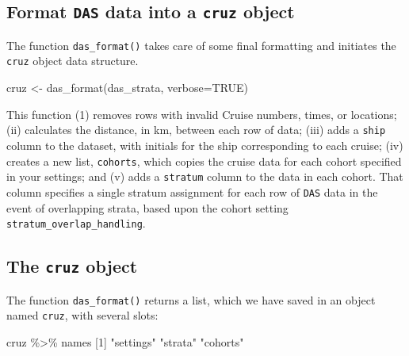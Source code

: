 \documentclass[
]{book}
\newenvironment{Shaded}{\begin{snugshade}}{\end{snugshade}}
\newcommand{\AttributeTok}[1]{\textcolor[rgb]{0.77,0.63,0.00}{#1}}
\newcommand{\ConstantTok}[1]{\textcolor[rgb]{0.00,0.00,0.00}{#1}}
\newcommand{\DecValTok}[1]{\textcolor[rgb]{0.00,0.00,0.81}{#1}}
\newcommand{\FunctionTok}[1]{\textcolor[rgb]{0.00,0.00,0.00}{#1}}
\newcommand{\NormalTok}[1]{#1}
\newcommand{\OtherTok}[1]{\textcolor[rgb]{0.56,0.35,0.01}{#1}}
\newcommand{\SpecialCharTok}[1]{\textcolor[rgb]{0.00,0.00,0.00}{#1}}
\newcommand{\StringTok}[1]{\textcolor[rgb]{0.31,0.60,0.02}{#1}}
\begin{document}
\hypertarget{format-das-data-into-a-cruz-object}{%
\subsection*{\texorpdfstring{Format \texttt{DAS} data into a \texttt{cruz} object}{Format DAS data into a cruz object}}\label{format-das-data-into-a-cruz-object}}

The function \texttt{das\_format()} takes care of some final formatting and initiates the \texttt{cruz} object data structure.

\begin{Shaded}
\begin{Highlighting}[]
\NormalTok{cruz }\OtherTok{\textless{}{-}} \FunctionTok{das\_format}\NormalTok{(das\_strata, }\AttributeTok{verbose=}\ConstantTok{TRUE}\NormalTok{)}
\end{Highlighting}
\end{Shaded}

This function (1) removes rows with invalid Cruise numbers, times, or locations; (ii) calculates the distance, in km, between each row of data; (iii) adds a \texttt{ship} column to the dataset, with initials for the ship corresponding to each cruise; (iv) creates a new list, \texttt{cohorts}, which copies the cruise data for each cohort specified in your settings; and (v) adds a \texttt{stratum} column to the data in each cohort. That column specifies
a single stratum assignment for each row of \texttt{DAS} data in the event of overlapping strata, based upon the cohort setting \texttt{stratum\_overlap\_handling}.

\hypertarget{the-cruz-object}{%
\subsection*{\texorpdfstring{The \texttt{cruz} object}{The cruz object}}\label{the-cruz-object}}

The function \texttt{das\_format()} returns a list, which we have saved in an object named \texttt{cruz}, with several slots:

\begin{Shaded}
\begin{Highlighting}[]
\NormalTok{cruz }\SpecialCharTok{\%\textgreater{}\%}\NormalTok{ names}
\NormalTok{[}\DecValTok{1}\NormalTok{] }\StringTok{"settings"} \StringTok{"strata"}   \StringTok{"cohorts"} 
\end{Highlighting}
\end{Shaded}
\end{document}
